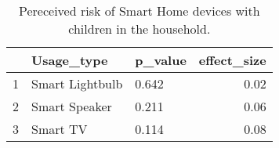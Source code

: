 \begin{table}[ht]
\centering
\begin{tabular}{rllr}
  \hline
 & Usage\_type & p\_value & effect\_size \\ 
  \hline
1 & Smart Lightbulb & 0.642   & 0.02 \\ 
  2 & Smart Speaker & 0.211   & 0.06 \\ 
  3 & Smart TV & 0.114   & 0.08 \\ 
   \hline
\end{tabular}
\caption{Pereceived risk of Smart Home devices with children in the household.} 
\label{RQ3_H3_PerceivedRiskChildren}
\end{table}
